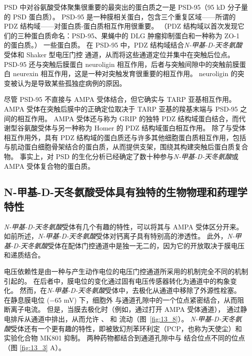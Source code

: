 PSD 中对谷氨酸受体聚集很重要的最突出的蛋白质之一是 PSD-95（95 kD 分子量的 PSD 蛋白质）。
PSD-95 是一种膜相关蛋白，包含三个重复区域——所谓的 PDZ 结构域——对蛋白质-蛋白质相互作用很重要。 （PDZ 结构域以首次发现它们的三种蛋白质命名：PSD-95、果蝇中的 DLG 肿瘤抑制蛋白和一种称为 ZO-1 的蛋白质。） 一些蛋白质。
在 PSD-95 中，PDZ 结构域结合\textit{N-甲基-D-天冬氨酸}受体和 Shaker 型电压门控  通道，从而将这些通道定位并集中在突触后位点。
PSD-95 还与突触后膜蛋白 neuroligin 相互作用，后者与突触间隙中的突触前膜蛋白 neurexin 相互作用，这是一种对突触发育很重要的相互作用。 neuroligin 的突变被认为是导致某些孤独症病例的原因。


尽管 PSD-95 不直接与 AMPA 受体结合，但它确实与 TARP 亚基相互作用。
AMPA 受体在突触后膜中的正确定位取决于 TARP 亚基的羧基末端与 PSD-95 之间的相互作用。
AMPA 受体还与称为 GRIP 的独特 PDZ 结构域蛋白结合，而代谢型谷氨酸受体与另一种称为 Homer 的 PDZ 结构域蛋白相互作用。
除了与受体相互作用外，具有 PDZ 结构域的蛋白质还与许多其他细胞蛋白质相互作用，包括与肌动蛋白细胞骨架结合的蛋白质，从而提供支架，围绕其构建突触后蛋白质复合物。
事实上，对 PSD 的生化分析已经确定了数十种参与\textit{N-甲基-D-天冬氨酸}或 AMPA 受体复合物的蛋白质。



\subsection{N-甲基-D-天冬氨酸受体具有独特的生物物理和药理学特性}

\textit{N-甲基-D-天冬氨酸}受体有几个有趣的特性，可以将其与 AMPA 受体区分开来。
如前所述，\textit{N-甲基-D-天冬氨酸}受体对钙离子具有特别高的渗透性。
此外，\textit{N-甲基-D-天冬氨酸}受体在配体门控通道中是独一无二的，因为它的开放取决于膜电压和递质结合。


电压依赖性是由一种与产生动作电位的电压门控通道所采用的机制完全不同的机制引起的。
在后者中，膜电位的变化通过固有电压传感器转化为通道中的构象变化。
然而，在\textit{N-甲基-D-天冬氨酸}受体中，去极化从通道中移除了外源性栓塞。
在静息膜电位 (−65 mV) 下，细胞外  与通道孔隙中的一个位点紧密结合，从而阻断离子电流。
但是，当膜去极化时（例如，通过打开 AMPA 受体通道）， 通过静电排斥从通道中排出，从而允许 、 和  流动（图~\ref{fig:13_8}）。 
\textit{N-甲基-D-天冬氨酸}受体还有一个更有趣的特性，即被致幻剂苯环利定（PCP，也称为天使尘）和实验化合物 MK801 抑制。
两种药物都结合到通道孔隙中与  结合位点不同的位点（图 \ref{fig:13_3} A）。


